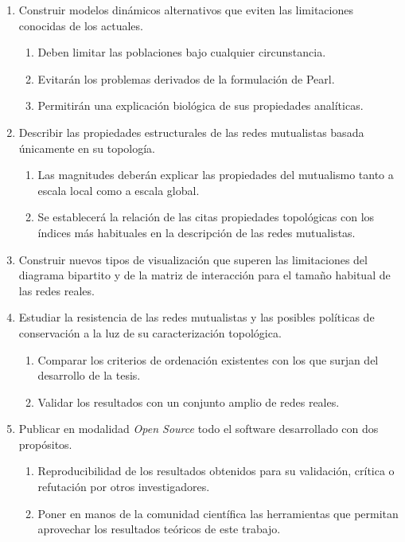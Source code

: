 \begin{enumerate}
\item Construir modelos dinámicos alternativos que eviten las limitaciones conocidas de los actuales.
   \begin{enumerate}
		\item Deben limitar las poblaciones bajo cualquier circunstancia.
		\item Evitarán los problemas derivados de la formulación de Pearl.
		\item Permitirán una explicación biológica de sus propiedades analíticas.
   \end{enumerate}
   
\item Describir las propiedades estructurales de las redes mutualistas basada únicamente en su topología.
		\begin{enumerate}
		\item Las magnitudes deberán explicar las propiedades del mutualismo tanto a escala local como a escala global.
		\item Se establecerá la relación de las citas propiedades topológicas con los índices más habituales en la descripción de las redes mutualistas.
		\end{enumerate}
		
\item Construir nuevos tipos de visualización que superen las limitaciones del diagrama bipartito y de la matriz de interacción para el tamaño habitual de las redes reales.

\item Estudiar la resistencia de las redes mutualistas y las posibles políticas de conservación a la luz de su caracterización topológica.
\begin{enumerate}
		\item Comparar los criterios de ordenación existentes con los que surjan del desarrollo de la tesis.
		\item Validar los resultados con un conjunto amplio de redes reales.
		\end{enumerate}
		
\item Publicar en modalidad \textit{Open Source} todo el software desarrollado con dos propósitos.
 \begin{enumerate}
		\item Reproducibilidad de los resultados obtenidos para su validación, crítica o refutación por otros investigadores.
		\item Poner en manos de la comunidad científica las herramientas que permitan aprovechar los resultados teóricos de este trabajo.
		\end{enumerate}
\end{enumerate}



